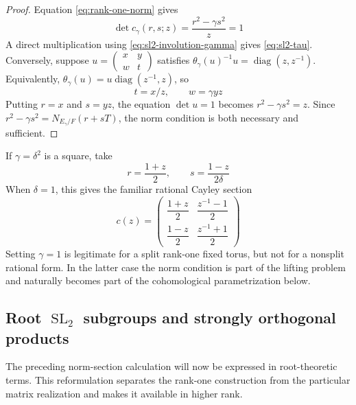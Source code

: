 \documentclass[11pt]{amsart}
\theoremstyle{definition}
\theoremstyle{remark}
\newcommand{\diag}{\operatorname{diag}}
\newcommand{\SL}{\operatorname{SL}}
\begin{document}
\begin{proof}
Equation \eqref{eq:rank-one-norm} gives
\[
 \det c_\gamma(r,s;z)=\frac{r^2-\gamma s^2}{z}=1
\]
A direct multiplication using \eqref{eq:sl2-involution-gamma} gives
\eqref{eq:sl2-tau}.  Conversely, suppose
$u=\left(\begin{smallmatrix}x&y\\w&t\end{smallmatrix}\right)$ satisfies
$\theta_\gamma(u)^{-1}u=\diag(z,z^{-1})$.  Equivalently,
$\theta_\gamma(u)=u\diag(z^{-1},z)$, so
\[
 t=x/z,\qquad w=\gamma yz
\]
Putting $r=x$ and $s=yz$, the equation $\det u=1$ becomes
$r^2-\gamma s^2=z$.  Since
$r^2-\gamma s^2=N_{E_\gamma/F}(r+sT)$, the norm condition is
both necessary and sufficient.
\end{proof}

If $\gamma=\delta^2$ is a square, take
\[
 r=\frac{1+z}{2},\qquad
 s=\frac{1-z}{2\delta}
\]
When $\delta=1$, this gives the familiar rational Cayley section
\begin{equation}\label{eq:cayley-section}
 c(z)=
 \begin{pmatrix}
 \dfrac{1+z}{2}&\dfrac{z^{-1}-1}{2}\\[5pt]
 \dfrac{1-z}{2}&\dfrac{z^{-1}+1}{2}
 \end{pmatrix}
\end{equation}
Setting $\gamma=1$ is legitimate for a split rank-one
fixed torus, but not for a nonsplit rational form.  In the latter case the
norm condition is part of the lifting problem and naturally becomes part of the cohomological parametrization below.

\subsection{\texorpdfstring{Root $\SL_2$ subgroups and strongly orthogonal products}{Root SL2 subgroups and strongly orthogonal products}}
The preceding norm-section calculation will now be expressed in root-theoretic
terms.  This reformulation separates the rank-one construction from the
particular matrix realization and makes it available in higher rank.
\end{document}
